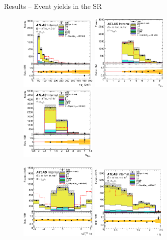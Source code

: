 \documentclass[10pt]{beamer}
\begin{document}
\begin{frame}{Results -- Event yields in the SR}
\begin{figure}
	 \includegraphics[width=0.33\textwidth]{figures/tauPt_SR.eps}
   \includegraphics[width=0.33\textwidth]{figures/jets_SR.eps}
   \includegraphics[width=0.33\textwidth]{figures/bJets_SR.eps}
\end{figure}
\begin{figure}
   \includegraphics[width=0.33\textwidth]{figures/tauMetPhi_SR.eps}
   \includegraphics[width=0.33\textwidth]{figures/tauEta_SR.eps}

\end{figure}
\end{frame}
\end{document}
